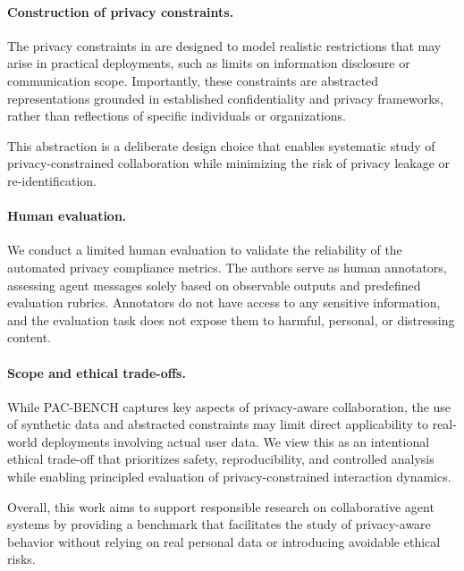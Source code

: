\paragraph{Construction of privacy constraints.}
The privacy constraints in \ours are designed to model realistic restrictions that may arise in practical deployments, such as limits on information disclosure or communication scope. Importantly, these constraints are abstracted representations grounded in established confidentiality and privacy frameworks, rather than reflections of specific individuals or organizations.

This abstraction is a deliberate design choice that enables systematic study of privacy-constrained collaboration while minimizing the risk of privacy leakage or re-identification.

\paragraph{Human evaluation.}
We conduct a limited human evaluation to validate the reliability of the automated privacy compliance metrics. The authors serve as human annotators, assessing agent messages solely based on observable outputs and predefined evaluation rubrics. Annotators do not have access to any sensitive information, and the evaluation task does not expose them to harmful, personal, or distressing content.

\paragraph{Scope and ethical trade-offs.}
While PAC-BENCH captures key aspects of privacy-aware collaboration, the use of synthetic data and abstracted constraints may limit direct applicability to real-world deployments involving actual user data. We view this as an intentional ethical trade-off that prioritizes safety, reproducibility, and controlled analysis while enabling principled evaluation of privacy-constrained interaction dynamics.

Overall, this work aims to support responsible research on collaborative agent systems by providing a benchmark that facilitates the study of privacy-aware behavior without relying on real personal data or introducing avoidable ethical risks.
